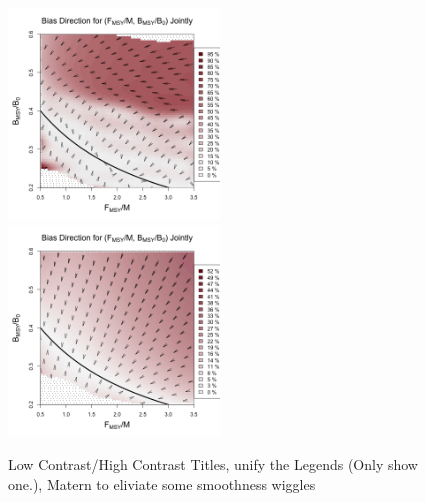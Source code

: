 \documentclass[12pt]{article}
\begin{document}
%
\begin{figure}[h!]
\includegraphics[width=0.5\textwidth]{../gpBias/directionalBiasSchnuteAnimatePrecentHHardFlatT30N150WWideN112X2.5Z0.45.png}
\includegraphics[width=0.5\textwidth]{../gpBias/directionalBiasSchnuteAnimatePrecentExpT45N150WideX3Z0.35.png}
\caption{\color{red} Low Contrast/High Contrast Titles, unify the Legends (Only show one.), Matern to eliviate some smoothness wiggles}
\end{figure}
\end{document}
